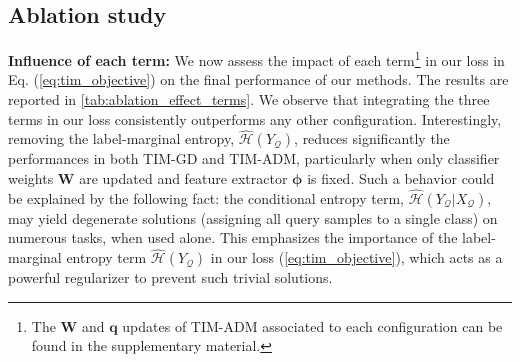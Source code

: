 \documentclass{article}
\begin{document}
    \subsection{Ablation study}

        \textbf{Influence of each term: }\label{sec:ablation_terms} We now assess the impact of each term\footnote{The $\textbf{W}$ and $\textbf{q}$ updates of TIM-ADM associated to each configuration can be found in the supplementary material.} in our loss in Eq. (\ref{eq:tim_objective}) on the final performance of our methods. The results are reported in \autoref{tab:ablation_effect_terms}. 
        We observe that integrating the three terms in our loss consistently outperforms any other configuration. Interestingly, removing the label-marginal entropy, $\widehat{\mathcal{H}}(Y_\mathcal{Q})$, reduces significantly the performances in both TIM-GD and TIM-ADM, particularly when only classifier weights $\textbf{W}$ are 
        updated and feature extractor $\boldsymbol{\phi}$ is fixed. 
Such a behavior could be explained by the following fact: the conditional entropy term, $\mathcal{\widehat{H}}(Y_\mathcal{Q}|X_\mathcal{Q})$, may yield degenerate solutions (assigning all query samples to a single class) on numerous tasks, when used alone. 
This emphasizes the importance of the label-marginal entropy term $\widehat{\mathcal{H}}(Y_\mathcal{Q})$ in our loss (\ref{eq:tim_objective}), which acts as a powerful regularizer to prevent such trivial solutions.
        
\end{document}
